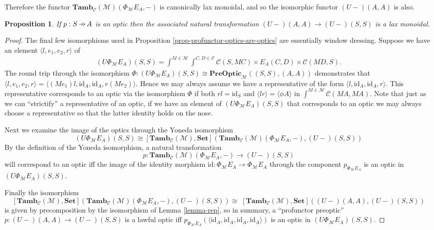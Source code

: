 \documentclass[11pt,a4paper]{article}
\theoremstyle{plain}
\newtheorem{proposition}[theorem]{Proposition}
\theoremstyle{definition}
\newcommand{\C}{\mathscr{C}}
\newcommand{\M}{\mathscr{M}}
\newcommand{\Pastro}{\Phi}
\newcommand{\Set}{\mathbf{Set}}
\newcommand{\PreOptic}{\mathbf{PreOptic}}
\newcommand{\Tamb}{\mathbf{Tamb}}
\newcommand{\id}{\mathrm{id}}
\newcommand{\hto}{\ensuremath{\,\mathaccent\shortmid\rightarrow\,}}
\begin{document}
Therefore the functor $\Tamb_\C(\M)(\Pastro_\M E_A, -)$ is canonically lax monoidal, and so the isomorphic functor $(U-)(A,A)$ is also.

\begin{proposition}
If $p : S \hto A$ is an optic then the associated natural transformation $(U-)(A,A) \to (U-)(S,S)$ is a lax monoidal.
\end{proposition}
\begin{proof}
The final few isomorphisms used in Proposition \ref{prop-profunctor-optics-are-optics} are essentially window dressing. Suppose we have an element $\langle l, e_1, e_2, r \rangle$ of 
\begin{align*}
(U\Pastro_\M E_A)(S,S) = \int^{M \in \M} \int^{C,D \in \C} \C(S, MC) \times E_A(C,D) \times \C(MD,S).
\end{align*}
The round trip through the isomorphism $\Phi : (U\Pastro_\M E_A)(S,S) \cong \PreOptic_\M((S, S), (A, A))$ demonstrates that $\langle l, e_1, e_2, r \rangle = \langle (M e_1)l, \id_A, \id_A, r(M e_2)\rangle$. Hence we may always assume we have a representative of the form $\langle l, \id_A, \id_A, r \rangle$. This representative corresponds to an optic via the isomorphism $\Phi$ if both $rl = \id_S$ and $\langle lr\rangle = \langle \phi A \rangle$ in $\int^{M \in \M} \C(M A, M A)$. Note that just as we can ``strictify'' a representative of an optic, if we have an element of $(U\Pastro_\M E_A)(S,S)$ that corresponds to an optic we may always choose a representative so that the latter identity holds on the nose.

Next we examine the image of the optics through the Yoneda isomorphism \[ (U\Pastro_\M E_A)(S,S) \cong [\Tamb_\C(\M), \Set](\Tamb_\C(\M)(\Pastro_\M E_A, -), (U-)(S,S)) \] 
By the definition of the Yoneda isomorphism, a natural transformation \[ p : \Tamb_\C(\M)(\Pastro_\M E_A, -) \to (U-)(S,S) \] will correspond to an optic iff the image of the identity morphism $\id : \Pastro_\M E_A \to \Pastro_\M E_A$ through the component $p_{\Pastro_\M E_A}$ is an optic in $(U\Pastro_\M E_A)(S, S)$. 

Finally the isomorphism \[ [\Tamb_\C(\M), \Set](\Tamb_\C(\M)(\Pastro_\M E_A, -), (U-)(S,S)) \cong \; [\Tamb_\C(\M), \Set]((U-)(A,A),(U-)(S,S)) \] is given by precomposition by the isomorphism of Lemma \ref{lemma-rep}, so in summary, a ``profunctor preoptic'' $p : (U-)(A, A) \to (U-)(S,S)$ is a lawful optic iff $p_{\Pastro_\M E_A}(\langle \id_A, \id_A, \id_A, \id_A \rangle)$ is an optic in $(U\Pastro_\M E_A)(S, S)$. 


\end{proof}
\end{document}
